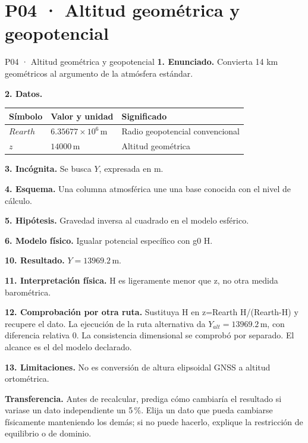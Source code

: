 \chapter*{P04 · Altitud geométrica y geopotencial}
\begin{studiumworked}{P04 · Altitud geométrica y geopotencial}
\textbf{1. Enunciado.} Convierta 14 km geométricos al argumento de la atmósfera estándar.

\textbf{2. Datos.}
\begin{longtable}{p{.16\linewidth}p{.35\linewidth}p{.38\linewidth}}\toprule Símbolo & Valor y unidad & Significado\\\midrule\endhead
$Rearth$ & $6.35677\times10^{6}\,\mathrm m$ & Radio geopotencial convencional\\
$z$ & $14000\,\mathrm m$ & Altitud geométrica\\
\bottomrule\end{longtable}
\textbf{3. Incógnita.} Se busca $Y$, expresada en $\mathrm m$.

\textbf{4. Esquema.} Una columna atmosférica une una base conocida con el nivel de cálculo.

\textbf{5. Hipótesis.} Gravedad inversa al cuadrado en el modelo esférico.

\textbf{6. Modelo físico.} Igualar potencial específico con g0 H.


\textbf{10. Resultado.} $Y=13969.2\,\mathrm m$.

\textbf{11. Interpretación física.} H es ligeramente menor que z, no otra medida barométrica.

\textbf{12. Comprobación por otra ruta.} Sustituya H en z=Rearth H/(Rearth-H) y recupere el dato. La ejecución de la ruta alternativa da $Y_{alt}=13969.2\,\mathrm m$, con diferencia relativa $0$. La consistencia dimensional se comprobó por separado. El alcance es el del modelo declarado.

\textbf{13. Limitaciones.} No es conversión de altura elipsoidal GNSS a altitud ortométrica.

\textbf{Transferencia.} Antes de recalcular, prediga cómo cambiaría el resultado si variase un dato independiente un 5\,\%. Elija un dato que pueda cambiarse físicamente manteniendo los demás; si no puede hacerlo, explique la restricción de equilibrio o de dominio.\par
\end{studiumworked}
